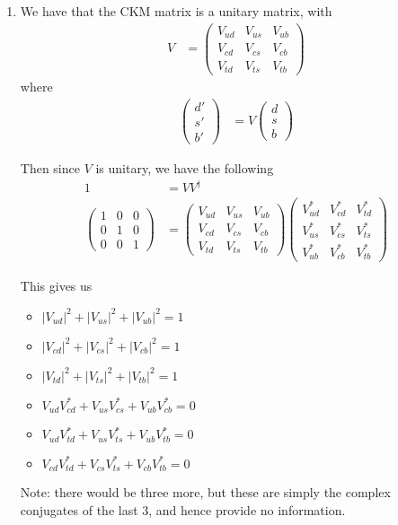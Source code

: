 \begin{enumerate}
	\item 
	We have that the CKM matrix is a unitary matrix, with
	\begin{align*}
		V &= 
		\begin{pmatrix}
			V_{ud} & V_{us} & V_{ub}\\
			V_{cd} & V_{cs} & V_{cb}\\
			V_{td} & V_{ts} & V_{tb}
		\end{pmatrix}
	\end{align*}
	where
	\begin{align*}
		\begin{pmatrix}
			d'\\
			s'\\
			b'
		\end{pmatrix} 
		&= V
		\begin{pmatrix}
			d\\
			s\\
			b
		\end{pmatrix}
	\end{align*}
	
	Then since $V$ is unitary, we have the following
	\begin{align*}
		1 &= VV^\dagger\\
		\begin{pmatrix}
			1 & 0 & 0 \\
			0 & 1 & 0 \\
			0 & 0 & 1
		\end{pmatrix}
		&= 
		\begin{pmatrix}
			V_{ud} & V_{us} & V_{ub}\\
			V_{cd} & V_{cs} & V_{cb}\\
			V_{td} & V_{ts} & V_{tb}
		\end{pmatrix}
		\begin{pmatrix}
			V_{ud}^* & V_{cd}^* & V_{td}^*\\
			V_{us}^* & V_{cs}^* & V_{ts}^*\\
			V_{ub}^* & V_{cb}^* & V_{tb}^*
		\end{pmatrix}
	\end{align*}
	
	This gives us
	\begin{itemize}
		\item $|V_{ud}|^2 + |V_{us}|^2 + |V_{ub}|^2 = 1$
		\item $|V_{cd}|^2 + |V_{cs}|^2 + |V_{cb}|^2 = 1$
		\item $|V_{td}|^2 + |V_{ts}|^2 + |V_{tb}|^2 = 1$
		\item $V_{ud}V_{cd}^* + V_{us}V_{cs}^* + V_{ub}V_{cb}^* = 0$
		\item $V_{ud}V_{td}^* + V_{us}V_{ts}^* + V_{ub}V_{tb}^* = 0$
		\item $V_{cd}V_{td}^* + V_{cs}V_{ts}^* + V_{cb}V_{tb}^* = 0$
	\end{itemize}
	Note: there would be three more, but these are simply the complex conjugates of the last 3, and hence provide no information.
	

\end{enumerate}
